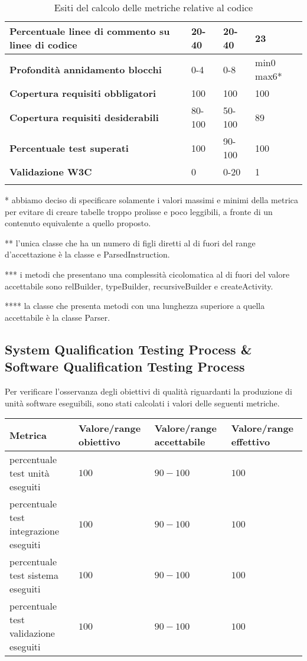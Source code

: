 \begin{longtable}{|p{5.5cm}|p{2.25cm}|p{2.25cm}|p{2.25cm}|}
		\hline
		\textbf{Percentuale linee di commento su linee di codice} &20-40 &20-40 &23\\
		\hline
		\textbf{Profondità annidamento blocchi} &0-4 &0-8 &min0 max6*\\
		\hline
		\textbf{Copertura requisiti obbligatori} &100 &100 &100\\
		\hline
		\textbf{Copertura requisiti desiderabili} &80-100 &50-100 &89\\
		\hline
		\textbf{Percentuale test superati} &100 &90-100 &100\\
		\hline
		\textbf{Validazione W3C} &0 &0-20 &1\\
		\hline
		
		\caption{Esiti del calcolo delle metriche relative al codice}
		\end{longtable}
	* abbiamo deciso di specificare solamente i valori massimi e minimi della metrica per evitare di creare tabelle troppo prolisse e poco leggibili, a fronte di un contenuto equivalente a quello proposto.
	
	** l'unica classe che ha un numero di figli diretti al di fuori del range d'accettazione è la classe e ParsedInstruction.
	
	*** i metodi che presentano una complessità cicolomatica al di fuori del valore accettabile sono relBuilder, typeBuilder, recursiveBuilder e createActivity.
	
	**** la classe che presenta metodi con una lunghezza superiore a quella accettabile è la classe Parser.
	
	
	\subsection{System Qualification Testing Process \& Software Qualification Testing Process}
		Per verificare l'osservanza degli obiettivi di qualità riguardanti la produzione di unità software eseguibili, sono stati calcolati i valori delle seguenti metriche.
		
	\begin{center}
\begin{tabular}{| p{6cm} | p{2.5cm} | p{2.5cm} | p{2.5cm} |}
	\hline
	\textbf{Metrica} & \textbf{Valore/range obiettivo} & \textbf{Valore/range accettabile} & \textbf{Valore/range effettivo} \\
	\hline
	percentuale test unità eseguiti & $100$ & $90-100$ & $100$\\
	\hline
	percentuale test integrazione eseguiti & $100$ & $90-100$ & $100$\\
	\hline
	percentuale test sistema eseguiti & $100$ & $90-100$ & $100$\\
	\hline
	percentuale test validazione eseguiti & $100$ & $90-100$ & $100$\\
	\hline
\end{tabular}
\end{center}
	
